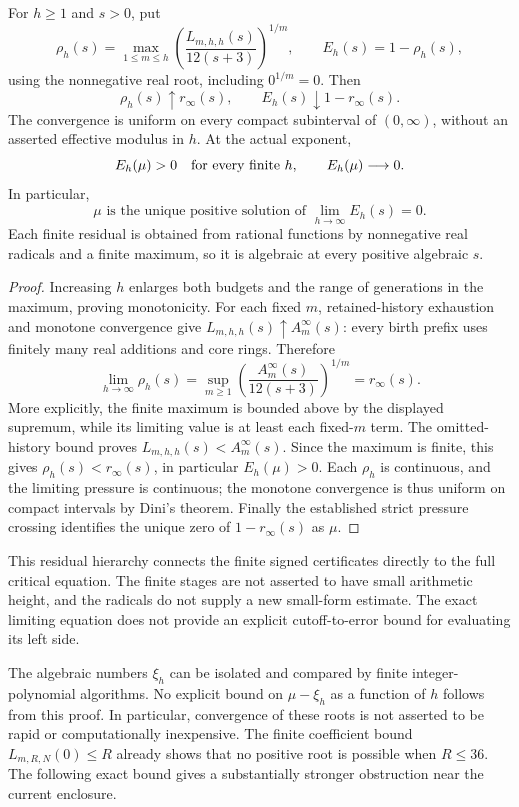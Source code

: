\begin{corollary}
\label{scp:pressure-residual}
For $h\ge1$ and $s>0$, put
\[
 \rho_h(s)=\max_{1\le m\le h}
 \left(\frac{L_{m,h,h}(s)}{12(s+3)}\right)^{1/m},
 \qquad E_h(s)=1-\rho_h(s),
\]
using the nonnegative real root, including $0^{1/m}=0$.
Then
\[
 \rho_h(s)\uparrow r_\infty(s),\qquad
 E_h(s)\downarrow 1-r_\infty(s).
\]
The convergence is uniform on every compact subinterval of $(0,\infty)$,
without an asserted effective modulus in $h$. At the actual exponent,
\[
 E_h(\mu)>0\quad\hbox{for every finite }h,
 \qquad E_h(\mu)\longrightarrow0.
\]
In particular,
\[
 \boxed{\displaystyle
 \mu\text{ is the unique positive solution of }
 \lim_{h\to\infty}E_h(s)=0.}
\]
Each finite residual is obtained from rational functions by nonnegative
real radicals and a finite maximum, so it is algebraic at every positive
algebraic $s$.
\end{corollary}
\begin{proof}
Increasing $h$ enlarges both budgets and the range of generations in
the maximum, proving monotonicity. For each fixed $m$, retained-history
exhaustion and monotone convergence give
$L_{m,h,h}(s)\uparrow A_m^\infty(s)$: every birth prefix uses finitely
many real additions and core rings. Therefore
\[
 \lim_{h\to\infty}\rho_h(s)
 =\sup_{m\ge1}
 \left(\frac{A_m^\infty(s)}{12(s+3)}\right)^{1/m}
 =r_\infty(s).
\]
More explicitly, the finite maximum is bounded above by the displayed
supremum, while its limiting value is at least each fixed-$m$ term.
The omitted-history bound proves $L_{m,h,h}(s)<A_m^\infty(s)$.
Since the maximum is finite, this gives
$\rho_h(s)<r_\infty(s)$, in particular $E_h(\mu)>0$.
Each $\rho_h$ is continuous, and the limiting pressure is continuous;
the monotone convergence is thus uniform on compact intervals by
Dini's theorem. Finally the established strict pressure crossing
identifies the unique zero of $1-r_\infty(s)$ as $\mu$.
\end{proof}

This residual hierarchy connects the finite signed certificates directly
to the full critical equation. The finite stages are not asserted to
have small arithmetic height, and the radicals do not supply a new
small-form estimate. The exact limiting equation does not provide an
explicit cutoff-to-error bound for evaluating its left side.

The algebraic numbers $\xi_h$ can be isolated and compared by finite
integer-polynomial algorithms. No explicit bound on $\mu-\xi_h$ as a
function of $h$ follows from this proof. In particular, convergence of
these roots is not asserted to be rapid or computationally inexpensive.
The finite coefficient bound $L_{m,R,N}(0)\le R$ already shows that
no positive root is possible when $R\le36$. The following exact bound
gives a substantially stronger obstruction near the current enclosure.

